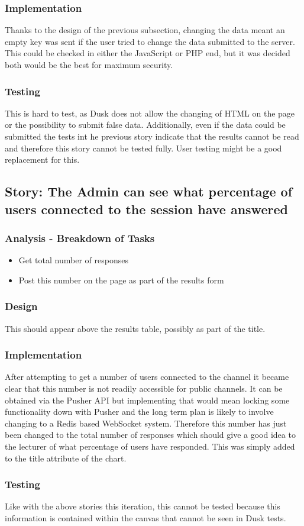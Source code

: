 \subsubsection{Implementation}
Thanks to the design of the previous subsection, changing the data meant an empty key was sent if the user tried to change the data submitted to the server. This could be checked in either the JavaScript or PHP end, but it was decided both would be the best for maximum security. 
\subsubsection{Testing}
This is hard to test, as Dusk does not allow the changing of HTML on the page or the possibility to submit false data. Additionally, even if the data could be submitted the tests int he previous story indicate that the results cannot be read and therefore this story cannot be tested fully. User testing might be a good replacement for this.
\newpage

\subsection{Story: The Admin can see what percentage of users connected to the session have answered}
\subsubsection{Analysis - Breakdown of Tasks}
\begin{itemize}
	\item Get total number of responses
	\item Post this number on the page as part of the results form
\end{itemize}
\subsubsection{Design}
This should appear above the results table, possibly as part of the title.
\subsubsection{Implementation}
After attempting to get a number of users connected to the channel it became clear that this number is not readily accessible for public channels. It can be obtained via the Pusher API but implementing that would mean locking some functionality down with Pusher and the long term plan is likely to involve changing to a Redis based WebSocket system. Therefore this number has just been changed to the total number of responses which should give a good idea to the lecturer of what percentage of users have responded. This was simply added to the title attribute of the chart.
\subsubsection{Testing}
Like with the above stories this iteration, this cannot be tested because this information is contained within the canvas that cannot be seen in Dusk tests.
\newpage
